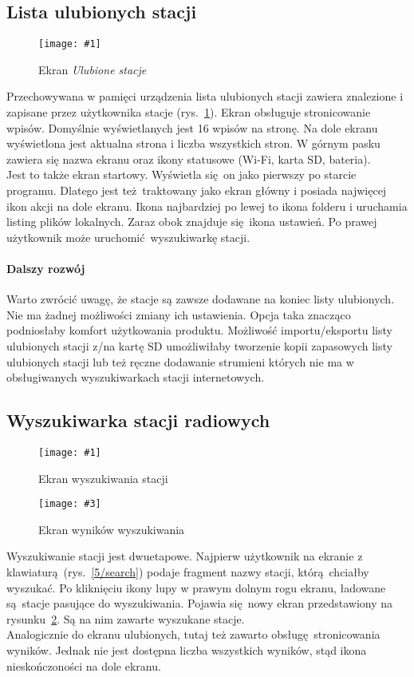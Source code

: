\documentclass[polish]{aghengthesis}
\newcommand{\imgint}[4]{
	\begin{figure}[{#4}]
		\centering
		\texttt{[image: \#1]}
		\caption{#2}
		\label{#1}
	\end{figure}
}
\newcommand{\imgh}[3]{\imgint{#1}{#2}{#3}{H}}
\newcommand{\imgintss}[5]{
	\begin{figure}[{#5}]
		\centering
		\begin{minipage}{.45\textwidth}
			\centering
			\texttt{[image: \#1]}
			\caption{#2}
			\label{#1}
		\end{minipage}%
		\hfill
		\begin{minipage}{.45\textwidth}
			\centering
			\texttt{[image: \#3]}
			\caption{#4}
			\label{#3}
		\end{minipage}
	\end{figure}
}
\newcommand{\imghss}[4]{\imgintss{#1}{#2}{#3}{#4}{H}}
\begin{document}
		\subsection{Lista ulubionych stacji}
			\imgh{5/fav}{Ekran \textit{Ulubione stacje}}{0.5}
			Przechowywana w pamięci urządzenia lista ulubionych stacji zawiera znalezione i zapisane przez użytkownika stacje (rys.~\ref{5/fav}).
			Ekran obsługuje stronicowanie wpisów. Domyślnie wyświetlanych jest 16 wpisów na stronę. Na dole ekranu wyświetlona jest aktualna strona i liczba wszystkich stron.
			W górnym pasku zawiera się nazwa ekranu oraz ikony statusowe (Wi-Fi, karta SD, bateria).
			$ $\\
			
			Jest to także ekran startowy. Wyświetla się on jako pierwszy po starcie programu. Dlatego jest też traktowany jako ekran główny i posiada najwięcej ikon akcji na dole ekranu.
			Ikona najbardziej po lewej to ikona folderu i uruchamia listing plików lokalnych. Zaraz obok znajduje się ikona ustawień. Po prawej użytkownik może uruchomić wyszukiwarkę stacji.
			
			\paragraph{Dalszy rozwój}
				Warto zwrócić uwagę, że stacje są zawsze dodawane na koniec listy ulubionych. Nie ma żadnej możliwości zmiany ich ustawienia. Opcja taka znacząco podniosłaby komfort użytkowania produktu. Możliwość importu/eksportu listy ulubionych stacji z/na kartę SD umożliwiłaby tworzenie kopii zapasowych listy ulubionych stacji lub też ręczne dodawanie strumieni których nie ma w obsługiwanych wyszukiwarkach stacji internetowych.
			
		\subsection{Wyszukiwarka stacji radiowych}
			\imghss{5/search}{Ekran wyszukiwania stacji}{5/searchres}{Ekran wyników wyszukiwania}
			Wyszukiwanie stacji jest dwuetapowe. Najpierw użytkownik na ekranie z klawiaturą (rys.~\ref{5/search}) podaje fragment nazwy stacji, którą chciałby wyszukać. Po kliknięciu ikony lupy w prawym dolnym rogu ekranu, ładowane są stacje pasujące do wyszukiwania. Pojawia się nowy ekran przedstawiony na rysunku~\ref{5/searchres}. Są na nim zawarte wyszukane stacje.
			$ $\\
			
			Analogicznie do ekranu ulubionych, tutaj też zawarto obsługę stronicowania wyników. Jednak nie jest dostępna liczba wszystkich wyników, stąd ikona nieskończoności na dole ekranu.
			
\end{document}
